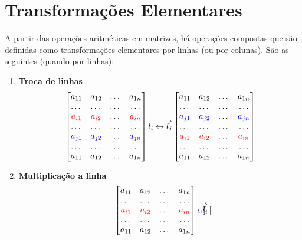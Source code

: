 \documentclass[]{report}
\begin{document}
\section{Transformações Elementares}
A partir das operações aritméticas em matrizes, há operações compostas que são definidas como transformações elementares por linhas (ou por colunas). São as seguintes (quando por linhas):
\begin{enumerate}
\item \textbf{Troca de linhas}
$$
\begin{bmatrix}
a_{11} & a_{12} & \dots & a_{1n}\\
\dots & \dots & \dots & \dots\\
\color{red}a_{i1} & \color{red}a_{i2} & \dots & \color{red}a_{in}\\
\dots & \dots & \dots & \dots\\
\color{blue}a_{j1} & \color{blue}a_{j2} & \dots & \color{blue}a_{jn}\\
\dots & \dots & \dots & \dots\\
a_{11} & a_{12} & \dots & a_{1n}\\
\end{bmatrix}
\overrightarrow{l_i \leftrightarrow l_j}
\begin{bmatrix}
a_{11} & a_{12} & \dots & a_{1n}\\
\dots & \dots & \dots & \dots\\
\color{blue}a_{j1} & \color{blue}a_{j2} & \dots & \color{blue}a_{jn}\\
\dots & \dots & \dots & \dots\\
\color{red}a_{i1} & \color{red}a_{i2} & \dots & \color{red}a_{in}\\
\dots & \dots & \dots & \dots\\
a_{11} & a_{12} & \dots & a_{1n}\\
\end{bmatrix}
$$
\item \textbf{Multiplicação a linha}
$$
\begin{bmatrix}
a_{11} & a_{12} & \dots & a_{1n}\\
\dots & \dots & \dots & \dots\\
\color{red}a_{i1} & \color{red}a_{i2} & \dots & \color{red}a_{in}\\
\dots & \dots & \dots & \dots\\
a_{11} & a_{12} & \dots & a_{1n}\\
\end{bmatrix}
\overrightarrow{\textcolor{blue}{\alpha} l_i}
\begin{bmatrix}

\end{bmatrix}$$
\end{enumerate}
\end{document}
